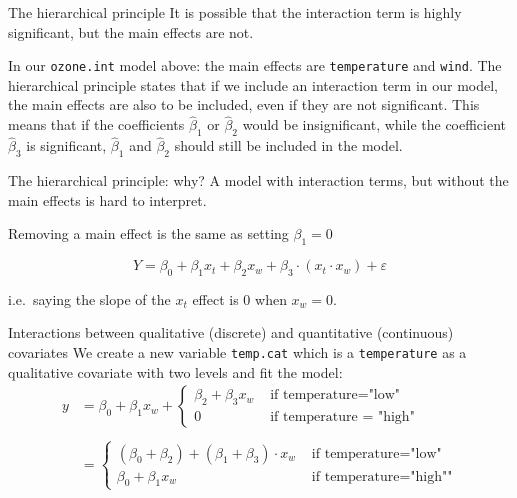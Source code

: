 \documentclass[
  ignorenonframetext,
]{beamer}
\begin{document}
\begin{frame}[fragile]
\begin{block}{The hierarchical principle}
\protect{}\label{the-hierarchical-principle}
It is possible that the interaction term is highly significant, but the
main effects are not.

In our \texttt{ozone.int} model above: the main effects are
\texttt{temperature} and \texttt{wind}. The hierarchical principle
states that if we include an interaction term in our model, the main
effects are also to be included, even if they are not significant. This
means that if the coefficients \(\hat \beta_1\) or \(\hat \beta_2\)
would be insignificant, while the coefficient \(\hat \beta_3\) is
significant, \(\hat \beta_1\) and \(\hat \beta_2\) should still be
included in the model.
\end{block}
\end{frame}

\begin{frame}
\begin{block}{The hierarchical principle: why?}
\protect{}\label{the-hierarchical-principle-why}
A model with interaction terms, but without the main effects is hard to
interpret.

Removing a main effect is the same as setting \(\beta_1=0\)

\[
Y = \beta_0 +  \beta_1 x_t + \beta_2 x_w + \beta_3\cdot(x_t  \cdot x_w) +\varepsilon
\]

i.e.~saying the slope of the \(x_t\) effect is 0 when \(x_w = 0\).
\end{block}
\end{frame}

\begin{frame}[fragile]
\begin{block}{Interactions between qualitative (discrete) and
quantitative (continuous) covariates}
\protect{}\label{interactions-between-qualitative-discrete-and-quantitative-continuous-covariates}
We create a new variable \texttt{temp.cat} which is a
\texttt{temperature} as a qualitative covariate with two levels and fit
the model:
\[\begin{aligned}y&=\beta_0 + \beta_1 x_w + \begin{cases} \beta_2 + \beta_3  x_w  &\text{ if temperature="low"}\\ 0 &\text{ if temperature = "high"}\end{cases} \\\\ &= \begin{cases} (\beta_0 + \beta_2) + (\beta_1 + \beta_3) \cdot x_w &\text{ if temperature="low"}\\ \beta_0 + \beta_1 x_w &\text{ if temperature="high""} \end{cases} \end{aligned}\]
\end{block}
\end{frame}
\end{document}
